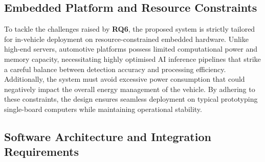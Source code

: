 


\subsection{Embedded Platform and Resource Constraints}

To tackle the challenges raised by \textbf{RQ6}, the proposed system is strictly tailored for in-vehicle deployment on resource-constrained embedded hardware. Unlike high-end servers, automotive platforms possess limited computational power and memory capacity, necessitating highly optimised AI inference pipelines that strike a careful balance between detection accuracy and processing efficiency. Additionally, the system must avoid excessive power consumption that could negatively impact the overall energy management of the vehicle. By adhering to these constraints, the design ensures seamless deployment on typical prototyping single-board computers while maintaining operational stability.

\subsection{Software Architecture and Integration Requirements}

